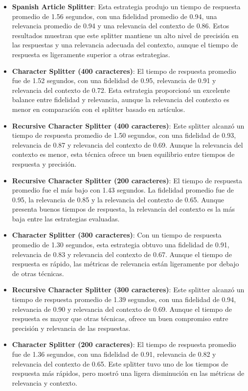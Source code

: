 \begin{itemize}
    \item \textbf{Spanish Article Splitter}: Esta estrategia produjo un tiempo de respuesta promedio de 1.56 segundos, con una fidelidad promedio de 0.94, una relevancia promedio de 0.94 y una relevancia del contexto de 0.86. Estos resultados muestran que este splitter mantiene un alto nivel de precisión en las respuestas y una relevancia adecuada del contexto, aunque el tiempo de respuesta es ligeramente superior a otras estrategias.
    
    \item \textbf{Character Splitter (400 caracteres)}: El tiempo de respuesta promedio fue de 1.52 segundos, con una fidelidad de 0.95, relevancia de 0.91 y relevancia del contexto de 0.72. Esta estrategia proporcionó un excelente balance entre fidelidad y relevancia, aunque la relevancia del contexto es menor en comparación con el splitter basado en artículos.
    
    \item \textbf{Recursive Character Splitter (400 caracteres)}: Este splitter alcanzó un tiempo de respuesta promedio de 1.50 segundos, con una fidelidad de 0.93, relevancia de 0.87 y relevancia del contexto de 0.69. Aunque la relevancia del contexto es menor, esta técnica ofrece un buen equilibrio entre tiempos de respuesta y precisión.
    
    \item \textbf{Recursive Character Splitter (200 caracteres)}: El tiempo de respuesta promedio fue el más bajo con 1.43 segundos. La fidelidad promedio fue de 0.95, la relevancia de 0.85 y la relevancia del contexto de 0.65. Aunque presenta buenos tiempos de respuesta, la relevancia del contexto es la más baja entre las estrategias evaluadas.
    
    \item \textbf{Character Splitter (300 caracteres)}: Con un tiempo de respuesta promedio de 1.30 segundos, esta estrategia obtuvo una fidelidad de 0.91, relevancia de 0.83 y relevancia del contexto de 0.67. Aunque el tiempo de respuesta es rápido, las métricas de relevancia están ligeramente por debajo de otras técnicas.
    
    \item \textbf{Recursive Character Splitter (300 caracteres)}: Este splitter alcanzó un tiempo de respuesta promedio de 1.39 segundos, con una fidelidad de 0.94, relevancia de 0.90 y relevancia del contexto de 0.69. Aunque el tiempo de respuesta es mayor que otras técnicas, ofrece un buen compromiso entre precisión y relevancia de las respuestas.
    
    \item \textbf{Character Splitter (200 caracteres)}: El tiempo de respuesta promedio fue de 1.36 segundos, con una fidelidad de 0.91, relevancia de 0.82 y relevancia del contexto de 0.65. Este splitter tuvo uno de los tiempos de respuesta más rápidos, pero mostró una ligera disminución en las métricas de relevancia y contexto.

\end{itemize}

